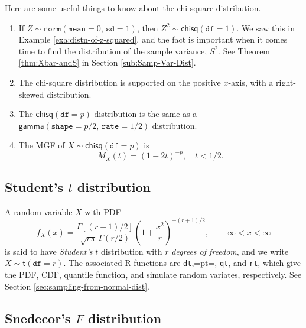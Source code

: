 \documentclass[captions=tableheading]{scrbook}
\begin{document}
\begin{rem}
Here are some useful things to know about the chi-square distribution.
\begin{enumerate}
\item If \(Z\sim\mathtt{norm}(\mathtt{mean}=0,\,\mathtt{sd}=1)\), then \(Z^{2}\sim\mathsf{chisq}(\mathtt{df}=1)\). We saw this in Example \ref{exa:distn-of-z-squared}, and the fact is important when it comes time to find the distribution of the sample variance, \(S^{2}\). See Theorem \ref{thm:Xbar-andS} in Section \ref{sub:Samp-Var-Dist}.
\item The chi-square distribution is supported on the positive \(x\)-axis, with a right-skewed distribution.
\item The \(\mathsf{chisq}(\mathtt{df}=p)\) distribution is the same as a \(\mathsf{gamma}(\mathtt{shape}=p/2,\,\mathtt{rate}=1/2)\) distribution.
\item The MGF of \(X\sim\mathsf{chisq}(\mathtt{df}=p)\) is
   \begin{equation}
   M_{X}(t)=\left(1-2t\right)^{-p},\quad t<1/2.\label{eq:mgf-chisq}
   \end{equation}
\end{enumerate}

\end{rem}
\subsection{Student's \(t\) distribution}
\label{sec-6-5-4}

\label{sub:Student's-t-distribution}

A random variable \(X\) with PDF
\begin{equation}
f_{X}(x)=\frac{\Gamma\left[(r+1)/2\right]}{\sqrt{r\pi}\,\Gamma(r/2)}\left(1+\frac{x^{2}}{r}\right)^{-(r+1)/2},\quad-\infty<x<\infty
\end{equation}
is said to have \emph{Student's} \(t\) distribution with \(r\) \emph{degrees of freedom}, and we write \(X\sim\mathsf{t}(\mathtt{df}=r)\). The associated \textsf{R} functions are \texttt{dt},=pt=, \texttt{qt}, and \texttt{rt}, which give the PDF, CDF, quantile function, and simulate random variates, respectively. See Section \ref{sec:sampling-from-normal-dist}.
\subsection{Snedecor's \(F\) distribution}
\label{sec-6-5-5}

\label{sub:snedecor-F-distribution}
\end{document}
